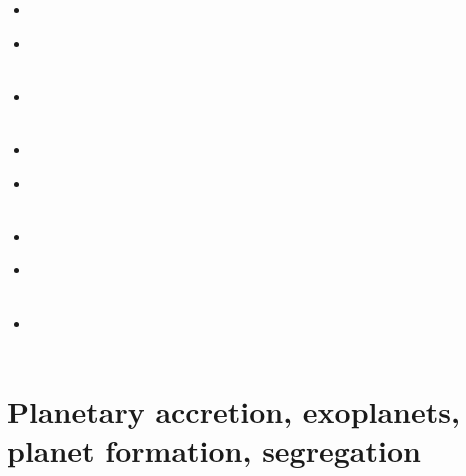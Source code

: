 \begin{scriptsize}
\begin{itemize}
\item[\nineteenninetyfour] 
\textcite{begl94b} \\
\item[\nineteenninetyfive] 
\textcite{belg95a} \\
\textcite{belg95b} \\
\item[\nineteenninetysix] 
\textcite{bekf96} \\
\textcite{como96} \\
\item[\nineteenninetyseven] 
\textcite{bekk97} \\
\item[\nineteenninetyeight] 
\textcite{pobe98} \\
\textcite{zhat98} \\
\item[\twothousandthree]
\textcite{hans03} \\
\item[\twothousandfour]
\textcite{katf04} \\
\textcite{huvv04} \\
\item[\twothousandten]
\textcite{yiha10} \\
\textcite{libe10} \\
\end{itemize}
\end{scriptsize}

\section{Planetary accretion, exoplanets, planet formation, segregation}

